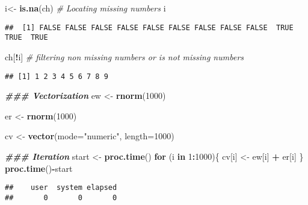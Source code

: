 \documentclass[
]{article}
\newenvironment{Shaded}{\begin{snugshade}}{\end{snugshade}}
\newcommand{\AttributeTok}[1]{\textcolor[rgb]{0.13,0.29,0.53}{#1}}
\newcommand{\CommentTok}[1]{\textcolor[rgb]{0.56,0.35,0.01}{\textit{#1}}}
\newcommand{\ControlFlowTok}[1]{\textcolor[rgb]{0.13,0.29,0.53}{\textbf{#1}}}
\newcommand{\DecValTok}[1]{\textcolor[rgb]{0.00,0.00,0.81}{#1}}
\newcommand{\DocumentationTok}[1]{\textcolor[rgb]{0.56,0.35,0.01}{\textbf{\textit{#1}}}}
\newcommand{\FunctionTok}[1]{\textcolor[rgb]{0.13,0.29,0.53}{\textbf{#1}}}
\newcommand{\NormalTok}[1]{#1}
\newcommand{\OtherTok}[1]{\textcolor[rgb]{0.56,0.35,0.01}{#1}}
\newcommand{\SpecialCharTok}[1]{\textcolor[rgb]{0.81,0.36,0.00}{\textbf{#1}}}
\newcommand{\StringTok}[1]{\textcolor[rgb]{0.31,0.60,0.02}{#1}}
\begin{document}
\begin{Shaded}
\begin{Highlighting}[]
\NormalTok{i}\OtherTok{\textless{}{-}} \FunctionTok{is.na}\NormalTok{(ch) }\CommentTok{\# Locating missing numbers}
\NormalTok{i}
\end{Highlighting}
\end{Shaded}

\begin{verbatim}
##  [1] FALSE FALSE FALSE FALSE FALSE FALSE FALSE FALSE FALSE  TRUE  TRUE  TRUE
\end{verbatim}

\begin{Shaded}
\begin{Highlighting}[]
\NormalTok{ch[}\SpecialCharTok{!}\NormalTok{i] }\CommentTok{\# filtering non missing numbers or is not missing numbers}
\end{Highlighting}
\end{Shaded}

\begin{verbatim}
## [1] 1 2 3 4 5 6 7 8 9
\end{verbatim}

\begin{Shaded}
\begin{Highlighting}[]
\DocumentationTok{\#\#\# Vectorization}
\NormalTok{ew }\OtherTok{\textless{}{-}} \FunctionTok{rnorm}\NormalTok{(}\DecValTok{1000}\NormalTok{)}

\NormalTok{er }\OtherTok{\textless{}{-}} \FunctionTok{rnorm}\NormalTok{(}\DecValTok{1000}\NormalTok{)}

\NormalTok{cv }\OtherTok{\textless{}{-}} \FunctionTok{vector}\NormalTok{(}\AttributeTok{mode=}\StringTok{"numeric"}\NormalTok{, }\AttributeTok{length=}\DecValTok{1000}\NormalTok{)}

\DocumentationTok{\#\#\# Iteration}
\NormalTok{start }\OtherTok{\textless{}{-}} \FunctionTok{proc.time}\NormalTok{()}
\ControlFlowTok{for}\NormalTok{ (i }\ControlFlowTok{in} \DecValTok{1}\SpecialCharTok{:}\DecValTok{1000}\NormalTok{)\{ }
\NormalTok{cv[i] }\OtherTok{\textless{}{-}}\NormalTok{ ew[i] }\SpecialCharTok{+}\NormalTok{ er[i] }
\NormalTok{\}}
\FunctionTok{proc.time}\NormalTok{()}\SpecialCharTok{{-}}\NormalTok{start}
\end{Highlighting}
\end{Shaded}

\begin{verbatim}
##    user  system elapsed 
##       0       0       0
\end{verbatim}
\end{document}

